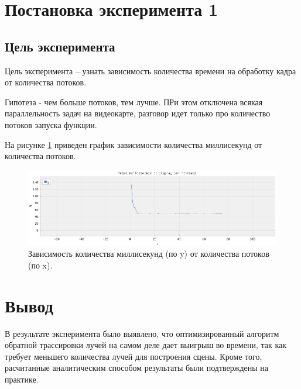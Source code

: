 \section{Постановка эксперимента 1} 

\subsection{Цель эксперимента}
Цель эксперимента -- узнать зависимость количества времени на обработку кадра от количества потоков.

Гипотеза - чем больше потоков, тем лучше. ПРи этом отключена всякая параллельность задач на видеокарте, разговор идет только про количество потоков запуска функции.

На рисунке \ref{img:e4} приведен график зависимости количества миллисекунд от количества потоков.

\begin{figure}[H]
	\begin{center}
		\includegraphics[scale=0.60]{img/avg_time_focused.png}
	\end{center}
	\captionsetup{justification=centering}
	\caption{Зависимость количества миллисекунд (по y) от количества потоков (по x). }
	\label{img:e4}
\end{figure}


\section*{Вывод}

В результате эксперимента было выявлено, что оптимизированный алгоритм обратной трассировки лучей на самом деле дает выигрыш во времени, так как требует меньшего количества лучей для построения сцены. Кроме того, расчитанные аналитическим способом результаты были подтверждены на практике.

